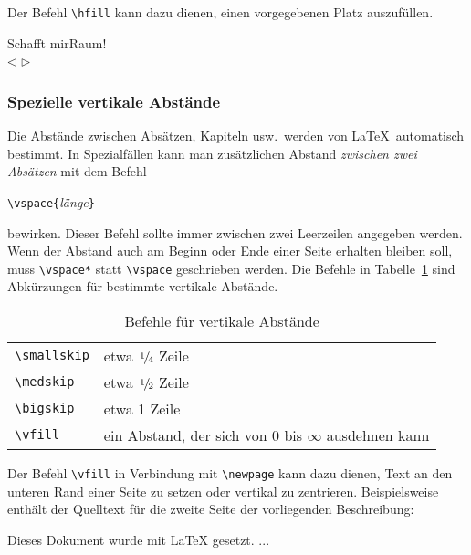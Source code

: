 Der Befehl \lstinline|\hfill|  kann dazu dienen, einen vorgegebenen Platz auszufüllen.

\begin{LTXexample}
\raggedright
Schafft mir\hspace{1.5cm}Raum! \\
$\triangleleft$\hfill
$\triangleright$
\end{LTXexample}



\subsubsection{Spezielle vertikale Abstände} \label{vabstaende}

Die Abstände zwischen Absätzen, Kapiteln usw.\ werden von
\LaTeX\ automatisch bestimmt.
In Spezialfällen kann man zusätzlichen Abstand
\emph{zwischen zwei Absätzen} mit dem Befehl
\begin{beispiel}
\lstinline|\vspace{|\textit{länge}\lstinline|}|
\end{beispiel}
bewirken.
Dieser Befehl sollte immer zwischen zwei Leerzeilen angegeben
werden.
Wenn der Abstand auch am Beginn oder Ende einer Seite erhalten
bleiben soll, muss \lstinline|\vspace*| statt \lstinline|\vspace|
geschrieben werden.
Die Befehle in Tabelle~\ref{vspace} sind Abkürzungen für
bestimmte vertikale Abstände.
\begin{table}[!htb]
\caption{Befehle für vertikale Abstände} \label{vspace}
\centering
\def\arraystretch{1.25}
\begin{tabular}{@{}ll@{}}
\toprule
\lstinline|\smallskip| & etwa $\nfrac{1}{4}$ Zeile \\
\lstinline|\medskip|   & etwa $\nfrac{1}{2}$ Zeile \\
\lstinline|\bigskip|   & etwa 1 Zeile \\
\lstinline|\vfill|     & ein Abstand, der sich von 0 bis $\infty$
                     ausdehnen kann\\
\bottomrule
\end{tabular}
\end{table}

Der Befehl \lstinline|\vfill| in Verbindung mit \lstinline|\newpage|
kann dazu dienen, Text an den unteren Rand einer Seite zu setzen
oder vertikal zu zentrieren.  Beispielsweise enthält der Quelltext
für die zweite Seite der vorliegenden Beschreibung:
\clearpage
\begin{example}
\vfill

Dieses Dokument wurde mit \LaTeX{} gesetzt.
...
\newpage
\end{example}


